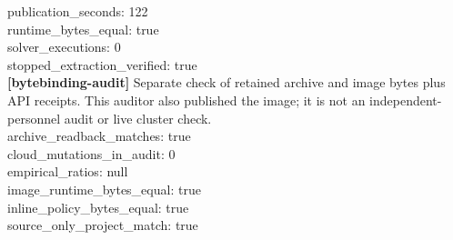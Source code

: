 \documentclass[11pt]{article}
\begin{document}
publication\_seconds: 122\\
runtime\_bytes\_equal: true\\
solver\_executions: 0\\
stopped\_extraction\_verified: true\\
\textbf{[bytebinding-audit]} Separate check of retained archive and image bytes plus API receipts. This auditor also published the image; it is not an independent-personnel audit or live cluster check.\\
archive\_readback\_matches: true\\
cloud\_mutations\_in\_audit: 0\\
empirical\_ratios: null\\
image\_runtime\_bytes\_equal: true\\
inline\_policy\_bytes\_equal: true\\
source\_only\_project\_match: true\\
\end{document}
